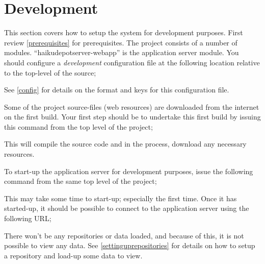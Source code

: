 
\section{Development}

This section covers how to setup the system for development purposes.  First review \ref{prerequisites} for prerequisites.  The project consists of a number of modules.  ``haikudepotserver-webapp'' is the application server module.  You should configure a {\it development} configuration file at the following location relative to the top-level of the source;


See \ref{config} for details on the format and keys for this configuration file.

Some of the project source-files (web resources) are downloaded from the internet on the first build.  Your first step should be to undertake this first build by issuing this command from the top level of the project;


This will compile the source code and in the process, download any necessary resources.

To start-up the application server for development purposes, issue the following command from the same top level of the project;


This may take some time to start-up; especially the first time.  Once it has started-up, it should be possible to connect to the application server using the following URL;


There won't be any repositories or data loaded, and because of this, it is not possible to view any data.  See \ref{settinguprepositories} for details on how to setup a repository and load-up some data to view.